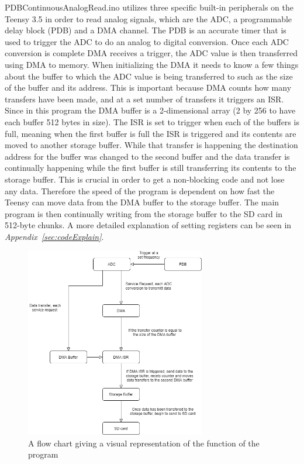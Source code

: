 PDBContinuousAnalogRead.ino utilizes three specific built-in peripherals on the Teensy 3.5 in order to read analog signals, which are the ADC, a programmable delay block (PDB) and a DMA channel.
The PDB is an accurate timer that is used to trigger the ADC to do an analog to digital conversion.
Once each ADC conversion is complete DMA receives a trigger, the ADC value is then transferred using DMA to memory.
When initializing the DMA it needs to know a few things about the buffer to which the ADC value is being transferred to such as the size of the buffer and its address. 
This is important because DMA counts how many transfers have been made, and at a set number of transfers it triggers an ISR.
Since in this program the DMA buffer is a 2-dimensional array (2 by 256 to have each buffer 512 bytes in size).
The ISR is set to trigger when each of the buffers is full, meaning when the first buffer is full the ISR is triggered and its contents are moved to another storage buffer.
While that transfer is happening the destination address for the buffer was changed to the second buffer and the data transfer is continually happening while the first buffer is still transferring its contents to the storage buffer.
This is crucial in order to get a non-blocking code and not lose any data.
Therefore the speed of the program is dependent on how fast the Teensy can move data from the DMA buffer to the storage buffer.
The main program is then continually writing from the storage buffer to the SD card in 512-byte chunks.
A more detailed explanation of setting registers can be seen in \textit{Appendix~\ref{sec:codeExplain}}.

\begin{figure}[h]
    \centering
    \includegraphics[width=0.70\textwidth]{graphics/flowChart.png}
    \caption{A flow chart giving a visual representation of the function of the program}
    \label{fig:CodeFlow}
\end{figure}


